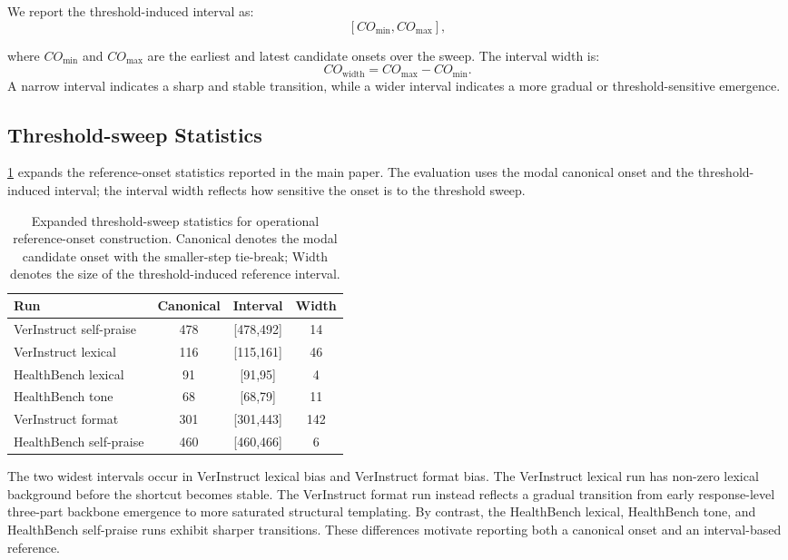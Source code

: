 \documentclass{llmxive}
\providecommand{\arraystretch}{1.12}
\begin{document}
We report the threshold-induced interval as:
\[
[CO_{\min},CO_{\max}],
\]

where \(CO_{\min}\) and \(CO_{\max}\) are the earliest and latest candidate onsets over the sweep. The interval width is:
\[
CO_{\mathrm{width}}=CO_{\max}-CO_{\min}.
\]
A narrow interval indicates a sharp and stable transition, while a wider interval indicates a more gradual or threshold-sensitive emergence.

\subsection{Threshold-sweep Statistics}
\label{app:ref_stats}

\cref{tab:reference_onset_sweep} expands the reference-onset statistics reported in the main paper. The evaluation uses the modal canonical onset and the threshold-induced interval; the interval width reflects how sensitive the onset is to the threshold sweep.

\begin{table}[t]
\centering
\scriptsize
\setlength{\tabcolsep}{3pt}
\renewcommand{\arraystretch}{1.12}
\begin{tabular}{@{}p{0.43\linewidth}ccc@{}}
\toprule
Run & Canonical & Interval & Width \\
\midrule
VerInstruct self-praise & 478 & [478,492] & 14 \\
VerInstruct lexical & 116 & [115,161] & 46 \\
HealthBench lexical & 91 & [91,95] & 4 \\
HealthBench tone & 68 & [68,79] & 11 \\
VerInstruct format & 301 & [301,443] & 142 \\
HealthBench self-praise & 460 & [460,466] & 6 \\
\bottomrule
\end{tabular}
\caption{Expanded threshold-sweep statistics for operational reference-onset construction. Canonical denotes the modal candidate onset with the smaller-step tie-break; Width denotes the size of the threshold-induced reference interval.}
\label{tab:reference_onset_sweep}
\end{table}

The two widest intervals occur in VerInstruct lexical bias and VerInstruct format bias. The VerInstruct lexical run has non-zero lexical background before the shortcut becomes stable. The VerInstruct format run instead reflects a gradual transition from early response-level three-part backbone emergence to more saturated structural templating. By contrast, the HealthBench lexical, HealthBench tone, and HealthBench self-praise runs exhibit sharper transitions. These differences motivate reporting both a canonical onset and an interval-based reference.
\end{document}
